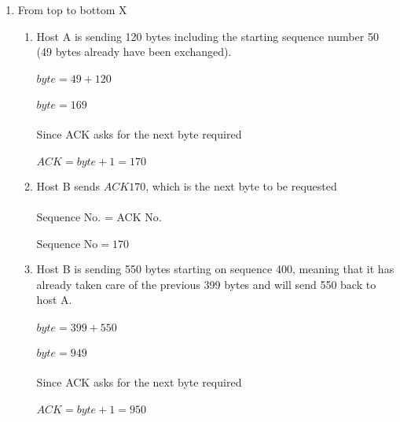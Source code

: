 \documentclass[12pt]{article}
\begin{document}
\begin{enumerate}
	\item From top to bottom X
		\begin{enumerate}
			\item Host A is sending 120 bytes including the starting sequence number 50 (49 bytes already have been exchanged).\\
			\\
			$byte = 49 + 120$\\
			\\
			$byte = 169$\\
			\\
			Since ACK asks for the next byte required\\
			\\
			$ACK = byte + 1 = 170$\\
			\item Host B sends $ACK 170$, which is the next byte to be requested\\
			\\
			Sequence No. = ACK No.\\
			\\
			$\text{Sequence No} = 170$\\
			\item Host B is sending 550 bytes starting on sequence 400, meaning that it has already taken care of the previous 399 bytes and will send 550 back to host A.\\
			\\
			$byte = 399 + 550$\\
			\\
			$byte = 949$\\
			\\
			Since ACK asks for the next byte required\\
			\\
			$ACK = byte + 1 = 950$\\

		\end{enumerate}


\end{enumerate}
\end{document}
